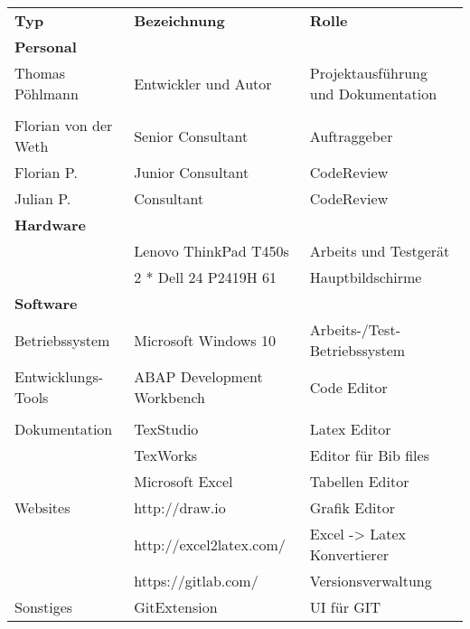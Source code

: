 \begin{tabu}{p{0.31\textwidth}p{0.31\textwidth}p{0.31\textwidth}}
\rowfont{\bfseries\leavevmode\color{headingfont}}\textbf{Typ} & \textbf{Bezeichnung} & \textbf{Rolle} \\
\textbf{Personal} & & \\\hline
Thomas Pöhlmann & Entwickler und Autor & Projektausführung und Dokumentation \\\\[-1em]\hline
Florian von der Weth & Senior Consultant & Auftraggeber \\\hline
Florian P. & Junior Consultant & CodeReview \\\hline
Julian P. & Consultant & CodeReview\\\hline
{}\textbf{Hardware} & & \\\hline
 & Lenovo ThinkPad T450s & Arbeits und Testgerät \\\hline
 & 2 * Dell 24 P2419H 61 & Hauptbildschirme \\\hline
{}\textbf{Software} & & \\\hline
Betriebssystem & Microsoft Windows 10 & Arbeits-/Test-Betriebssystem \\\hline
Entwicklungs-Tools & ABAP Development Workbench & Code Editor \\\\[-1em]\hline
Dokumentation & TexStudio & Latex Editor \\\hline
 & TexWorks & Editor für Bib files \\\hline
 & Microsoft Excel & Tabellen Editor \\\hline
Websites & http://draw.io & Grafik Editor \\\hline
 & http://excel2latex.com/ & Excel -> Latex Konvertierer \\\hline
 & https://gitlab.com/ & Versionsverwaltung \\\hline
Sonstiges & GitExtension & UI für GIT \\\hline 
\end{tabu}